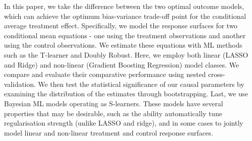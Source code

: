 \documentclass[12pt, a4paper]{article}
\begin{document}
In this paper, we take the difference between the two optimal outcome models, which can achieve the optimum bias-variance trade-off point for the conditional average treatment effect. Specifically, we model the response surfaces for two conditional mean equations - one using the treatment observations and another using the control observations. We estimate these equations with ML methods such as the T-learner and Doubly Robust. Here, we employ both linear (LASSO and Ridge) and non-linear (Gradient Boosting Regression) model classes. We compare and evaluate their comparative performance using nested cross-validation. We then test the statistical significance of our causal parameters by examining the distribution of the estimates through bootstrapping. Last, we use Bayesian ML models operating as S-learners. 
These models have several properties that may be desirable, such as the ability
automatically tune regularisation strength (unlike LASSO and ridge), and in some
cases to jointly model linear and non-linear treatment and control response surfaces.
\end{document}
